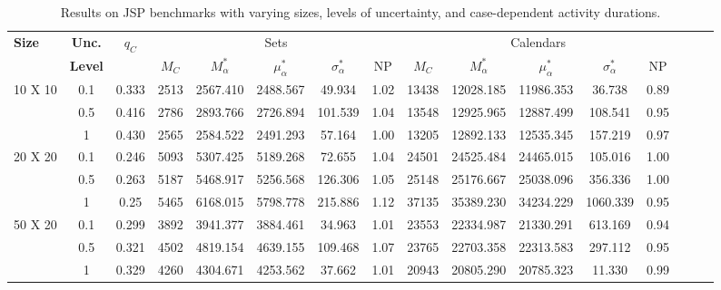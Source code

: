\documentclass{article}
\begin{document}
\begin{table}[h]
\centering
\begin{tabular}{l@{\hskip 0.05in}c@{\hskip 0.05in}c@{\hskip 0.07in}c@{\hskip 0.05in}c@{\hskip 0.05in}c@{\hskip 0.05in}c@{\hskip 0.05in}c@{\hskip 0.05in}c@{\hskip 0.05in}c@{\hskip 0.05in}c@{\hskip 0.04in}c@{\hskip 0.05in}c@{\hskip 0.05in}c@{\hskip 0.05in}c@{\hskip 0.05in}c@{\hskip 0.04in}}
\toprule
\textbf{Size} & \textbf{Unc.} & \textbf{$q_{C}$} & \multicolumn{5}{c}{Sets} & \multicolumn{5}{c}{Calendars} &
 \\
& \textbf{Level} & & $M_{C}$ & $M^*_{\alpha}$ & $\mu^*_{\alpha}$ & $\sigma^*_{\alpha}$ & NP & $M_{C}$ & $M^*_{\alpha}$ & $\mu^*_{\alpha}$ & $\sigma^*_{\alpha}$ &  NP \\
\midrule
  \multirow{3}{*}{10 X 10} & 0.1 &  0.333 & 2513 & 2567.410 & 2488.567 & 49.934 & 1.02 & 13438 & 12028.185 & 11986.353 & 36.738 & 0.89\\
  & 0.5 & 0.416 & 2786 & 2893.766 & 2726.894 & 101.539 & 1.04 & 13548 & 12925.965 & 12887.499 & 108.541 & 0.95 \\
  & 1 & 0.430 & 2565 & 2584.522 & 2491.293 & 57.164 & 1.00 & 13205 & 12892.133 & 12535.345 & 157.219 & 0.97\\
  \midrule
  
 \multirow{3}{*}{20 X 20} & 0.1 &  0.246 & 5093 & 5307.425 & 5189.268 & 72.655 & 1.04 & 24501 & 24525.484 & 24465.015 & 105.016 & 1.00 \\
  & 0.5 & 0.263 & 5187 & 5468.917 & 5256.568 & 126.306  & 1.05 & 25148 & 25176.667 & 25038.096 & 356.336 & 1.00\\
  & 1 & 0.25 & 5465 & 6168.015 & 5798.778 & 215.886 & 1.12 & 37135 & 35389.230 & 34234.229 & 1060.339 & 0.95 \\
  \midrule

\multirow{3}{*}{50 X 20} & 0.1 & 0.299 & 3892 & 3941.377 & 3884.461 & 34.963 & 1.01 & 23553 & 22334.987 & 21330.291 & 613.169 & 0.94 \\
  & 0.5 & 0.321 & 4502 & 4819.154 & 4639.155 & 109.468 & 1.07 & 23765 & 22703.358 & 22313.583 & 297.112 & 0.95\\
  & 1 & 0.329 & 4260 & 4304.671 & 4253.562 & 37.662 & 1.01 & 20943 & 20805.290 & 20785.323 & 11.330 & 0.99 \\
  
  \bottomrule
\end{tabular}
\caption{Results on JSP benchmarks with varying sizes, levels of uncertainty, and case-dependent activity durations.}
\label{tab:resultSynthetic_prediction_appendix}
\end{table}
\end{document}
